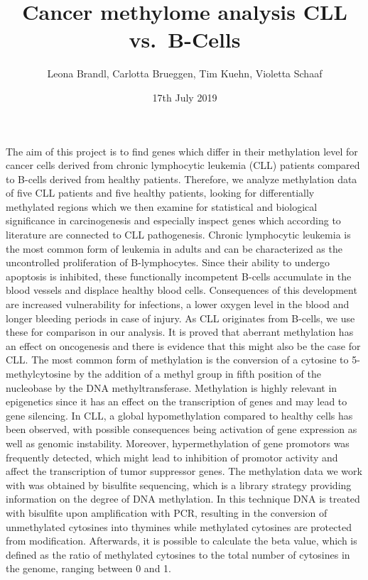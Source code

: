 \documentclass[]{article}
\title{Cancer methylome analysis CLL vs.~B-Cells}
\author{Leona Brandl, Carlotta Brueggen, Tim Kuehn, Violetta Schaaf}
\date{17th July 2019}
\begin{document}
\maketitle

The aim of this project is to find genes which differ in their
methylation level for cancer cells derived from chronic lymphocytic
leukemia (CLL) patients compared to B-cells derived from healthy
patients. Therefore, we analyze methylation data of five CLL patients
and five healthy patients, looking for differentially methylated regions
which we then examine for statistical and biological significance in
carcinogenesis and especially inspect genes which according to
literature are connected to CLL pathogenesis. Chronic lymphocytic
leukemia is the most common form of leukemia in adults and can be
characterized as the uncontrolled proliferation of B-lymphocytes. Since
their ability to undergo apoptosis is inhibited, these functionally
incompetent B-cells accumulate in the blood vessels and displace healthy
blood cells. Consequences of this development are increased
vulnerability for infections, a lower oxygen level in the blood and
longer bleeding periods in case of injury. As CLL originates from
B-cells, we use these for comparison in our analysis. It is proved that
aberrant methylation has an effect on oncogenesis and there is evidence
that this might also be the case for CLL. The most common form of
methylation is the conversion of a cytosine to 5-methylcytosine by the
addition of a methyl group in fifth position of the nucleobase by the
DNA methyltransferase. Methylation is highly relevant in epigenetics
since it has an effect on the transcription of genes and may lead to
gene silencing. In CLL, a global hypomethylation compared to healthy
cells has been observed, with possible consequences being activation of
gene expression as well as genomic instability. Moreover,
hypermethylation of gene promotors was frequently detected, which might
lead to inhibition of promotor activity and affect the transcription of
tumor suppressor genes. The methylation data we work with was obtained
by bisulfite sequencing, which is a library strategy providing
information on the degree of DNA methylation. In this technique DNA is
treated with bisulfite upon amplification with PCR, resulting in the
conversion of unmethylated cytosines into thymines while methylated
cytosines are protected from modification. Afterwards, it is possible to
calculate the beta value, which is defined as the ratio of methylated
cytosines to the total number of cytosines in the genome, ranging
between 0 and 1.
\end{document}
